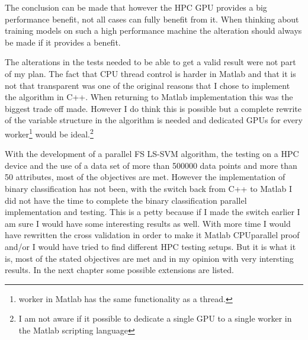 The conclusion can be made that however the HPC GPU provides a big performance benefit, not all cases can fully benefit from it.
When thinking about training models on such a high performance machine the alteration should always be made if it provides a benefit.
\par  
The alterations in the tests needed to be able to get a valid result were not part of my plan.
The fact that CPU thread control is harder in Matlab and that it is not that transparent was one of the original reasons that I chose to implement the algorithm in C++.
When returning to Matlab implementation this was the biggest trade off made.
However I do think this is possible but a complete rewrite of the variable structure in the algorithm is needed and dedicated GPUs for every worker\footnote{worker in Matlab has the same functionality as a thread.} would be ideal.\footnote{I am not aware if it possible to dedicate a single GPU to a single worker in the Matlab scripting language}
\par 
With the development of a parallel FS LS-SVM algorithm, the testing on a HPC device and the use of a data set of more than 500000 data points and more than 50 attributes, most of the objectives are met. 
However the implementation of binary classification has not been, with the switch back from C++ to Matlab I did not have the time to complete the binary classification parallel implementation and testing. 
This is a petty because if I made the switch earlier I am sure I would have some interesting results as well.
With more time I would have rewritten the cross validation in order to make it Matlab CPUparallel proof and/or I would have tried to find different HPC testing setups.
But it is what it is, most of the stated objectives are met and in my opinion with very intersting results.
In the next chapter some possible extensions are listed.

 


